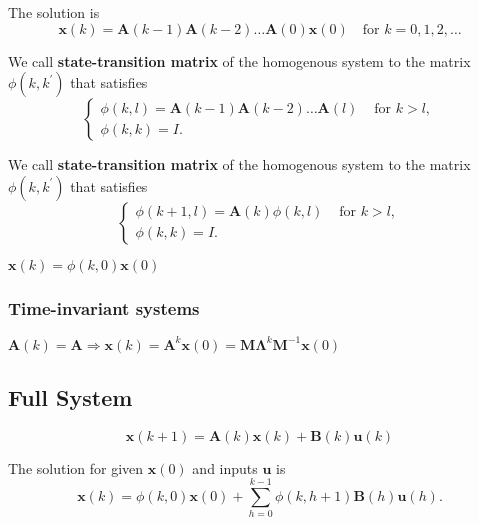 \begin{proposition} The solution is
    \[
        \mathbf{x}(k) = \mathbf{A}(k - 1)\mathbf{A}(k - 2)\dots \mathbf{A}(0)\mathbf{x}(0) \quad\text{for } k = 0,1,2, \ldots
    \]
\end{proposition}

\begin{definition}
    We call \textbf{state-transition matrix} of the homogenous system to the matrix \(\phi (k,k^{\prime})\) that satisfies
    \[
        \left\{ \begin{array}{ll}\phi (k,l) = \mathbf{A}(k - 1)\mathbf{A}(k - 2)\dots \mathbf{A}(l) & \text{ for } k > l,\\ \phi (k,k) = I. \end{array} \right.
    \]
\end{definition}

\begin{definition}
    We call \textbf{state-transition matrix} of the homogenous system to the matrix \(\phi (k,k^{\prime})\) that satisfies
    \[
        \left\{ \begin{array}{ll}\phi (k + 1,l) = \mathbf{A}(k)\phi (k,l) & \text{ for } k > l,\\ \phi (k,k) = I. \end{array} \right.
    \]
\end{definition}

\begin{remark*}
    $ \mathbf{x}(k) = \phi (k,0)\mathbf{x}(0) $
\end{remark*}

\subsubsection{Time-invariant systems} $\mathbf{A}(k) = \mathbf{A} \Longrightarrow  \mathbf{x}(k) = \mathbf{A} ^{k}\mathbf{x}(0) = \mathbf{M}\mathbf{\Lambda}^{k}\mathbf{M}^{-1}\mathbf{x}(0)$

\subsection{Full System}
\[
    \mathbf{x}(k + 1) = \mathbf{A}(k)\mathbf{x}(k) + \mathbf{B}(k)\mathbf{u}(k)
\]
\begin{proposition}
    The solution for given \(\mathbf{x}(0)\) and inputs \(\mathbf{u}\) is
    \[
        \mathbf{x}(k) = \phi (k,0)\mathbf{x}(0) + \sum_{h = 0}^{k - 1}\phi (k,h + 1)\mathbf{B}(h)\mathbf{u}(h).
    \]
\end{proposition}


